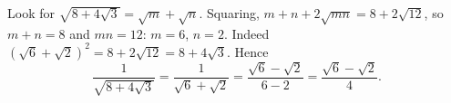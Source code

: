 Look for $\sqrt{8+4\sqrt3}=\sqrt m+\sqrt n$. Squaring, $m+n+2\sqrt{mn}=8+2\sqrt{12}$, so $m+n=8$ and $mn=12$: $m=6$, $n=2$. Indeed $\left(\sqrt6+\sqrt2\right)^2=8+2\sqrt{12}=8+4\sqrt3$. Hence
\[
\dfrac{1}{\sqrt{8+4\sqrt3}}=\dfrac{1}{\sqrt6+\sqrt2}=\dfrac{\sqrt6-\sqrt2}{6-2}=\boxed{\dfrac{\sqrt6-\sqrt2}{4}}.
\]
